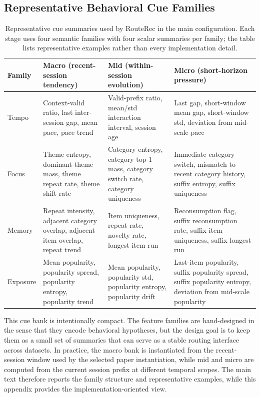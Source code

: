 \documentclass[sigconf,review,anonymous]{acmart}
\begin{document}
\subsection{Representative Behavioral Cue Families}

\begin{table}[!t]
  \centering
  \caption{Representative cue summaries used by RouteRec in the main configuration. Each stage uses four semantic families with four scalar summaries per family; the table lists representative examples rather than every implementation detail.}
  \label{tab:appendix-feature-families}
  \footnotesize
  \setlength{\tabcolsep}{4pt}
  \renewcommand{\arraystretch}{1.05}
  \begin{tabularx}{\textwidth}{@{}lXXX@{}}
    \toprule
    Family & Macro (recent-session tendency) & Mid (within-session evolution) & Micro (short-horizon pressure) \\
    \midrule
    Tempo & Context-valid ratio, last inter-session gap, mean pace, pace trend & Valid-prefix ratio, mean/std interaction interval, session age & Last gap, short-window mean gap, short-window std, deviation from mid-scale pace \\
    Focus & Theme entropy, dominant-theme mass, theme repeat rate, theme shift rate & Category entropy, category top-1 mass, category switch rate, category uniqueness & Immediate category switch, mismatch to recent category history, suffix entropy, suffix uniqueness \\
    Memory & Repeat intensity, adjacent category overlap, adjacent item overlap, repeat trend & Item uniqueness, repeat rate, novelty rate, longest item run & Reconsumption flag, suffix reconsumption rate, suffix item uniqueness, suffix longest run \\
    Exposure & Mean popularity, popularity spread, popularity entropy, popularity trend & Mean popularity, popularity std, popularity entropy, popularity drift & Last-item popularity, suffix popularity spread, suffix popularity entropy, deviation from mid-scale popularity \\
    \bottomrule
  \end{tabularx}
\end{table}

This cue bank is intentionally compact. The feature families are hand-designed in the sense that they encode behavioral hypotheses, but the design goal is to keep them as a small set of summaries that can serve as a stable routing interface across datasets. In practice, the macro bank is instantiated from the recent-session window used by the selected paper instantiation, while mid and micro are computed from the current session prefix at different temporal scopes. The main text therefore reports the family structure and representative examples, while this appendix provides the implementation-oriented view.
\end{document}
